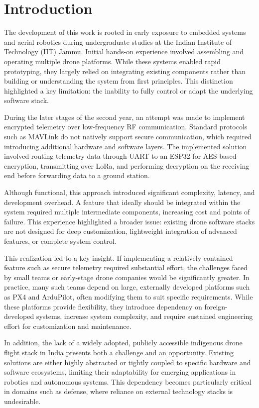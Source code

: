 \chapter{Introduction}
\label{chap:intro}

The development of this work is rooted in early exposure to embedded systems and aerial robotics during undergraduate studies at the Indian Institute of Technology (IIT) Jammu. Initial hands-on experience involved assembling and operating multiple drone platforms. While these systems enabled rapid prototyping, they largely relied on integrating existing components rather than building or understanding the system from first principles. This distinction highlighted a key limitation: the inability to fully control or adapt the underlying software stack.

During the later stages of the second year, an attempt was made to implement encrypted telemetry over low-frequency RF communication. Standard protocols such as MAVLink do not natively support secure communication, which required introducing additional hardware and software layers. The implemented solution involved routing telemetry data through UART to an ESP32 for AES-based encryption, transmitting over LoRa, and performing decryption on the receiving end before forwarding data to a ground station.

Although functional, this approach introduced significant complexity, latency, and development overhead. A feature that ideally should be integrated within the system required multiple intermediate components, increasing cost and points of failure. This experience highlighted a broader issue: existing drone software stacks are not designed for deep customization, lightweight integration of advanced features, or complete system control.

This realization led to a key insight. If implementing a relatively contained feature such as secure telemetry required substantial effort, the challenges faced by small teams or early-stage drone companies would be significantly greater. In practice, many such teams depend on large, externally developed platforms such as PX4 and ArduPilot, often modifying them to suit specific requirements. While these platforms provide flexibility, they introduce dependency on foreign-developed systems, increase system complexity, and require sustained engineering effort for customization and maintenance.

In addition, the lack of a widely adopted, publicly accessible indigenous drone flight stack in India presents both a challenge and an opportunity. Existing solutions are either highly abstracted or tightly coupled to specific hardware and software ecosystems, limiting their adaptability for emerging applications in robotics and autonomous systems. This dependency becomes particularly critical in domains such as defense, where reliance on external technology stacks is undesirable.

